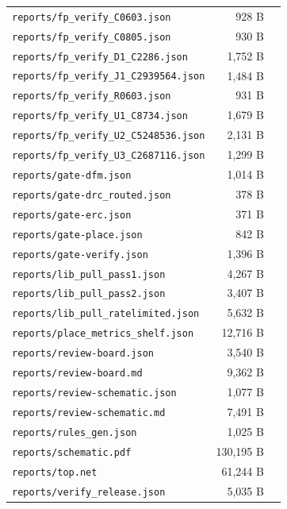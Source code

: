 \documentclass[11pt,a4paper]{article}
\begin{document}
{\begin{longtable}{p{9cm}rp{4cm}}
\texttt{reports/fp\_verify\_C0603.json} & 928 B &  \\
\texttt{reports/fp\_verify\_C0805.json} & 930 B &  \\
\texttt{reports/fp\_verify\_D1\_C2286.json} & 1,752 B &  \\
\texttt{reports/fp\_verify\_J1\_C2939564.json} & 1,484 B &  \\
\texttt{reports/fp\_verify\_R0603.json} & 931 B &  \\
\texttt{reports/fp\_verify\_U1\_C8734.json} & 1,679 B &  \\
\texttt{reports/fp\_verify\_U2\_C5248536.json} & 2,131 B &  \\
\texttt{reports/fp\_verify\_U3\_C2687116.json} & 1,299 B &  \\
\texttt{reports/gate-dfm.json} & 1,014 B &  \\
\texttt{reports/gate-drc\_routed.json} & 378 B &  \\
\texttt{reports/gate-erc.json} & 371 B &  \\
\texttt{reports/gate-place.json} & 842 B &  \\
\texttt{reports/gate-verify.json} & 1,396 B &  \\
\texttt{reports/lib\_pull\_pass1.json} & 4,267 B &  \\
\texttt{reports/lib\_pull\_pass2.json} & 3,407 B &  \\
\texttt{reports/lib\_pull\_ratelimited.json} & 5,632 B &  \\
\texttt{reports/place\_metrics\_shelf.json} & 12,716 B &  \\
\texttt{reports/review-board.json} & 3,540 B &  \\
\texttt{reports/review-board.md} & 9,362 B &  \\
\texttt{reports/review-schematic.json} & 1,077 B &  \\
\texttt{reports/review-schematic.md} & 7,491 B &  \\
\texttt{reports/rules\_gen.json} & 1,025 B &  \\
\texttt{reports/schematic.pdf} & 130,195 B &  \\
\texttt{reports/top.net} & 61,244 B &  \\
\texttt{reports/verify\_release.json} & 5,035 B &  \\
\bottomrule
\end{longtable}
}
\end{document}

